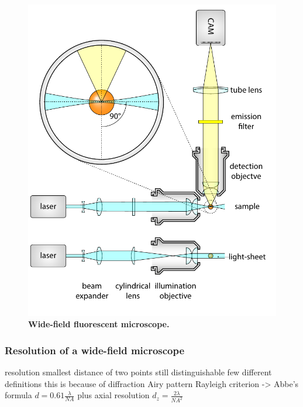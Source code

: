 \documentclass{diploma_style}
\begin{document}
\begin{figure}[htbp]
    \centering
    \includegraphics[page=4,scale=0.8]{figures/1_spim/spim_cyl}
    \caption{\textbf{Wide-field fluorescent microscope.}}
    \label{fig:wide-field}
\end{figure}

\subsubsection{Resolution of a wide-field microscope}

resolution
smallest distance of two points still distinguishable
few different definitions
this is because of diffraction
Airy pattern
Rayleigh criterion -> Abbe's formula
$d = 0.61 \frac{\lambda}{NA}$
plus axial resolution
$d_z = \frac{2\lambda}{NA^2}$
\end{document}
